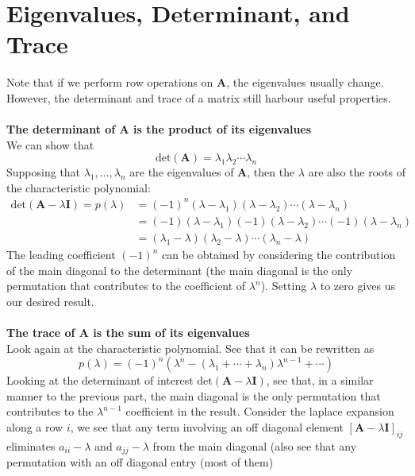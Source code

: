 \documentclass{report}
\begin{document}
\section{Eigenvalues, Determinant, and Trace}
Note that if we perform row operations on $\bm A$, the eigenvalues usually change. However, the determinant and trace of a matrix still harbour useful properties.\\
\vspace{1mm}\\
\textbf{The determinant of $\bm A$ is the product of its eigenvalues}\\
We can show that
\begin{equation*}
\text{det}(\bm A)=\lambda_1\lambda_2\cdots\lambda_n
\end{equation*}
Supposing that $\lambda_1,\ldots,\lambda_n$ are the eigenvalues of $\bm A$, then the $\lambda$ are also the roots of the characteristic polynomial:
\begin{align*}
\text{det}(\bm A-\lambda\bm I)=p(\lambda)&=(-1)^n(\lambda-\lambda_1)(\lambda-\lambda_2)\cdots(\lambda-\lambda_n)\\
&=(-1)(\lambda-\lambda_1)(-1)(\lambda-\lambda_2)\cdots(-1)(\lambda-\lambda_n)\\
&=(\lambda_1-\lambda)(\lambda_2-\lambda)\cdots(\lambda_n-\lambda)
\end{align*}
The leading coefficient $(-1)^n$ can be obtained by considering the contribution of the main diagonal to the determinant (the main diagonal is the only permutation that 
contributes to the coefficient of $\lambda^n$). Setting $\lambda$ to zero gives us our desired result.\\
\vspace{1mm}\\
\textbf{The trace of $\bm A$ is the sum of its eigenvalues}\\
Look again at the characteristic polynomial. See that it can be rewritten as
\begin{equation*}
p(\lambda)=(-1)^n(\lambda^n-(\lambda_1+\cdots+\lambda_n)\lambda^{n-1}+\cdots)
\end{equation*}
Looking at the determinant of interest $\text{det}(\bm A-\lambda\bm I)$, see that, in a similar manner to the previous part, the main diagonal is the only permutation that
contributes to the $\lambda^{n-1}$ coefficient in the result. Consider the laplace expansion along a row $i$, we see that any term involving an off diagonal element 
$[\bm A-\lambda\bm I]_{ij}$ eliminates $a_{ii}-\lambda$ and $a_{jj}-\lambda$ from the main diagonal (also see that any permutation with an off diagonal entry (most of them) 
\end{document}
